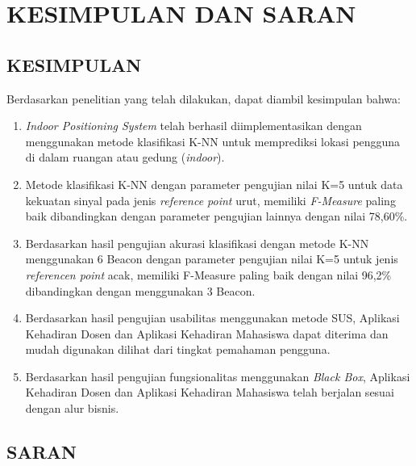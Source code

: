 \fancyhf{} 
\fancyfoot[C]{\thepage}
\chapter{KESIMPULAN DAN SARAN}

\section{\uppercase{KESIMPULAN}}
	Berdasarkan penelitian yang telah dilakukan, dapat diambil kesimpulan bahwa:
	\begin{enumerate}
		\item \textit{Indoor Positioning System} telah berhasil diimplementasikan dengan menggunakan metode klasifikasi K-NN untuk memprediksi lokasi pengguna di dalam ruangan atau gedung (\textit{indoor}).
		\item Metode klasifikasi K-NN dengan parameter pengujian nilai K=5 untuk data kekuatan sinyal pada jenis \textit{reference point} urut, memiliki \textit{F-Measure} paling baik dibandingkan dengan parameter pengujian lainnya dengan nilai 78,60\%.
		\item Berdasarkan hasil pengujian akurasi klasifikasi dengan metode K-NN menggunakan 6 Beacon dengan parameter pengujian nilai K=5 untuk jenis \textit{referencen point} acak, memiliki F-Measure paling baik dengan nilai 96,2\% dibandingkan dengan menggunakan 3 Beacon.
		\item Berdasarkan hasil pengujian usabilitas menggunakan metode SUS, Aplikasi Kehadiran Dosen dan Aplikasi Kehadiran Mahasiswa dapat diterima dan mudah digunakan dilihat dari tingkat pemahaman pengguna.
		\item Berdasarkan hasil pengujian fungsionalitas menggunakan \textit{Black Box}, Aplikasi Kehadiran Dosen dan Aplikasi Kehadiran Mahasiswa telah berjalan sesuai dengan alur bisnis.
	\end{enumerate}



\section{\uppercase{SARAN}}

